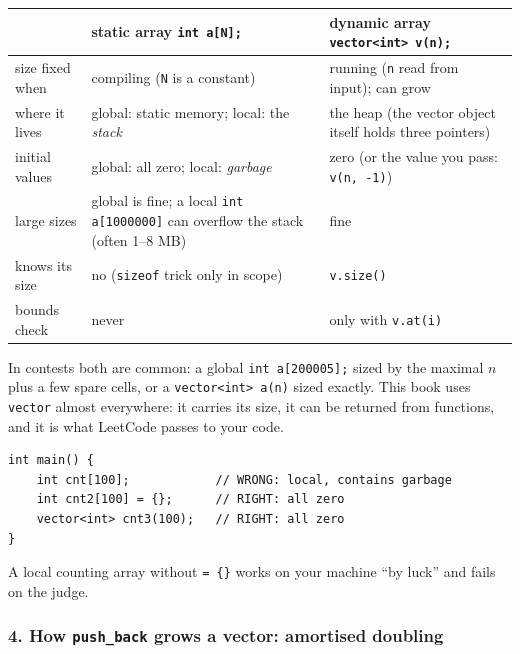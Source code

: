 \begin{table}[H]
\centering\small
\renewcommand{\arraystretch}{1.2}
\begin{tabularx}{\linewidth}{@{}>{\raggedright\arraybackslash}p{2.9cm} >{\raggedright\arraybackslash}X >{\raggedright\arraybackslash}X@{}}
\toprule
 & \textbf{static array} \texttt{int a[N];} & \textbf{dynamic array} \texttt{vector<int> v(n);} \\
\midrule
size fixed when & compiling (\texttt{N} is a constant) & running (\texttt{n} read from input); can grow \\
where it lives & global: static memory; local: the \emph{stack} & the heap (the vector object itself holds three pointers) \\
initial values & global: all zero; local: \emph{garbage} & zero (or the value you pass: \texttt{v(n, -1)}) \\
large sizes & global is fine; a local \texttt{int a[1000000]} can overflow the stack (often 1--8 MB) & fine \\
knows its size & no (\texttt{sizeof} trick only in scope) & \texttt{v.size()} \\
bounds check & never & only with \texttt{v.at(i)} \\
\bottomrule
\end{tabularx}
\end{table}

In contests both are common: a global \texttt{int a[200005];} sized by the maximal $n$ plus a few spare cells, or a \texttt{vector<int> a(n)} sized exactly. This book uses \texttt{vector} almost everywhere: it carries its size, it can be returned from functions, and it is what LeetCode passes to your code.

\begin{warningbox}
\begin{lstlisting}[style=snippet]
int main() {
    int cnt[100];            // WRONG: local, contains garbage
    int cnt2[100] = {};      // RIGHT: all zero
    vector<int> cnt3(100);   // RIGHT: all zero
}
\end{lstlisting}
A local counting array without \texttt{= \{\}} works on your machine ``by luck'' and fails on the judge.
\end{warningbox}

\subsubsection*{4. How \texttt{push\_back} grows a vector: amortised doubling}

